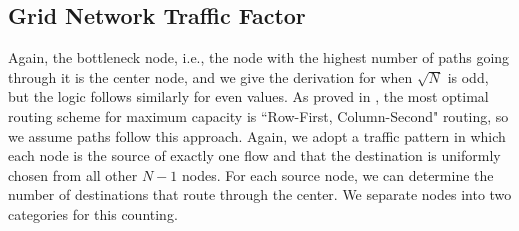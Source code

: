 %
%
%

\subsection{Grid Network Traffic Factor}

Again, the bottleneck node, i.e., the node with the highest number of paths going through it is the center node, and we give the derivation for when $\sqrt{N}$ is odd, but the logic follows similarly for even values.  As proved in \cite{lattice_nets_cap_opt_routing}, the most optimal routing scheme for maximum capacity is ``Row-First, Column-Second" routing, so we assume paths follow this approach.  Again, we adopt a traffic pattern in which each node is the source of exactly one flow and that the destination is uniformly chosen from all other $N-1$ nodes.  
For each source node, we can determine the number of destinations that route through the center.  We separate nodes into two categories for this counting.

